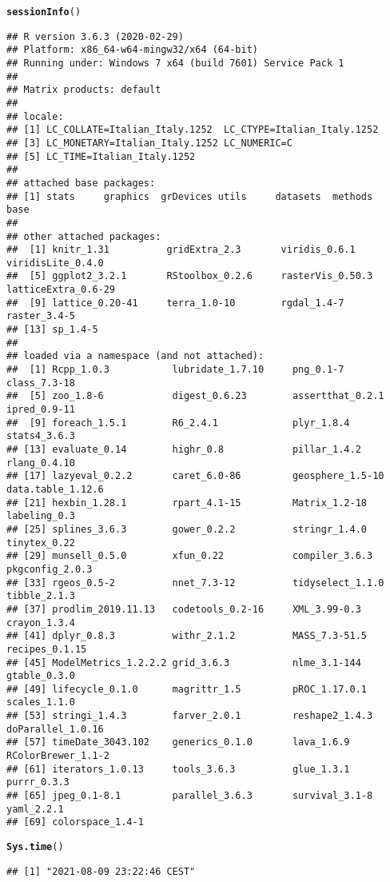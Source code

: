 \documentclass{article}\usepackage[]{graphicx}\usepackage[]{color}
\makeatletter
\newcommand{\hlstd}[1]{\textcolor[rgb]{0.345,0.345,0.345}{#1}}%
\newcommand{\hlkwd}[1]{\textcolor[rgb]{0.737,0.353,0.396}{\textbf{#1}}}%
\newenvironment{kframe}{%
 \def\at@end@of@kframe{}%
 \ifinner\ifhmode%
  \def\at@end@of@kframe{\end{minipage}}%
  \begin{minipage}{\columnwidth}%
 \fi\fi%
 \def\FrameCommand##1{\hskip\@totalleftmargin \hskip-\fboxsep
 \colorbox{shadecolor}{##1}\hskip-\fboxsep
     \hskip-\linewidth \hskip-\@totalleftmargin \hskip\columnwidth}%
 \MakeFramed {\advance\hsize-\width
   \@totalleftmargin\z@ \linewidth\hsize
   \@setminipage}}%
 {\par\unskip\endMakeFramed%
 \at@end@of@kframe}
\newenvironment{knitrout}{}{} %
\makeatother
\begin{document}
\begin{knitrout}
\color{fgcolor}\begin{kframe}
\begin{alltt}
\hlkwd{sessionInfo}\hlstd{()}
\end{alltt}
\begin{verbatim}
## R version 3.6.3 (2020-02-29)
## Platform: x86_64-w64-mingw32/x64 (64-bit)
## Running under: Windows 7 x64 (build 7601) Service Pack 1
## 
## Matrix products: default
## 
## locale:
## [1] LC_COLLATE=Italian_Italy.1252  LC_CTYPE=Italian_Italy.1252   
## [3] LC_MONETARY=Italian_Italy.1252 LC_NUMERIC=C                  
## [5] LC_TIME=Italian_Italy.1252    
## 
## attached base packages:
## [1] stats     graphics  grDevices utils     datasets  methods   base     
## 
## other attached packages:
##  [1] knitr_1.31          gridExtra_2.3       viridis_0.6.1       viridisLite_0.4.0  
##  [5] ggplot2_3.2.1       RStoolbox_0.2.6     rasterVis_0.50.3    latticeExtra_0.6-29
##  [9] lattice_0.20-41     terra_1.0-10        rgdal_1.4-7         raster_3.4-5       
## [13] sp_1.4-5           
## 
## loaded via a namespace (and not attached):
##  [1] Rcpp_1.0.3           lubridate_1.7.10     png_0.1-7            class_7.3-18        
##  [5] zoo_1.8-6            digest_0.6.23        assertthat_0.2.1     ipred_0.9-11        
##  [9] foreach_1.5.1        R6_2.4.1             plyr_1.8.4           stats4_3.6.3        
## [13] evaluate_0.14        highr_0.8            pillar_1.4.2         rlang_0.4.10        
## [17] lazyeval_0.2.2       caret_6.0-86         geosphere_1.5-10     data.table_1.12.6   
## [21] hexbin_1.28.1        rpart_4.1-15         Matrix_1.2-18        labeling_0.3        
## [25] splines_3.6.3        gower_0.2.2          stringr_1.4.0        tinytex_0.22        
## [29] munsell_0.5.0        xfun_0.22            compiler_3.6.3       pkgconfig_2.0.3     
## [33] rgeos_0.5-2          nnet_7.3-12          tidyselect_1.1.0     tibble_2.1.3        
## [37] prodlim_2019.11.13   codetools_0.2-16     XML_3.99-0.3         crayon_1.3.4        
## [41] dplyr_0.8.3          withr_2.1.2          MASS_7.3-51.5        recipes_0.1.15      
## [45] ModelMetrics_1.2.2.2 grid_3.6.3           nlme_3.1-144         gtable_0.3.0        
## [49] lifecycle_0.1.0      magrittr_1.5         pROC_1.17.0.1        scales_1.1.0        
## [53] stringi_1.4.3        farver_2.0.1         reshape2_1.4.3       doParallel_1.0.16   
## [57] timeDate_3043.102    generics_0.1.0       lava_1.6.9           RColorBrewer_1.1-2  
## [61] iterators_1.0.13     tools_3.6.3          glue_1.3.1           purrr_0.3.3         
## [65] jpeg_0.1-8.1         parallel_3.6.3       survival_3.1-8       yaml_2.2.1          
## [69] colorspace_1.4-1
\end{verbatim}
\begin{alltt}
\hlkwd{Sys.time}\hlstd{()}
\end{alltt}
\begin{verbatim}
## [1] "2021-08-09 23:22:46 CEST"
\end{verbatim}
\end{kframe}
\end{knitrout}
\end{document}
